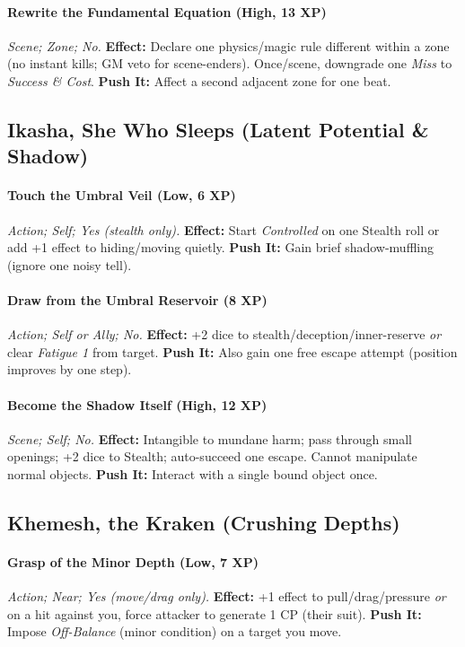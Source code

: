 \documentclass[12pt,twoside]{book}
\begin{document}
\paragraph{Rewrite the Fundamental Equation (High, 13 XP)} \emph{Scene; Zone; No.}
\textbf{Effect:} Declare one physics/magic rule different within a zone (no instant kills; GM veto for scene-enders). Once/scene, downgrade one \emph{Miss} to \emph{Success \& Cost}.
\textbf{Push It:} Affect a second adjacent zone for one beat.

\subsection{Ikasha, She Who Sleeps (Latent Potential \& Shadow)}
\paragraph{Touch the Umbral Veil (Low, 6 XP)} \emph{Action; Self; Yes (stealth only).}
\textbf{Effect:} Start \emph{Controlled} on one Stealth roll or add +1 effect to hiding/moving quietly.
\textbf{Push It:} Gain brief shadow-muffling (ignore one noisy tell).
\paragraph{Draw from the Umbral Reservoir (8 XP)} \emph{Action; Self or Ally; No.}
\textbf{Effect:} +2 dice to stealth/deception/inner-reserve \emph{or} clear \emph{Fatigue 1} from target.
\textbf{Push It:} Also gain one free escape attempt (position improves by one step).
\paragraph{Become the Shadow Itself (High, 12 XP)} \emph{Scene; Self; No.}
\textbf{Effect:} Intangible to mundane harm; pass through small openings; +2 dice to Stealth; auto-succeed one escape. Cannot manipulate normal objects.
\textbf{Push It:} Interact with a single bound object once.

\subsection{Khemesh, the Kraken (Crushing Depths)}
\paragraph{Grasp of the Minor Depth (Low, 7 XP)} \emph{Action; Near; Yes (move/drag only).}
\textbf{Effect:} +1 effect to pull/drag/pressure \emph{or} on a hit against you, force attacker to generate 1 CP (their suit).
\textbf{Push It:} Impose \emph{Off-Balance} (minor condition) on a target you move.
\end{document}
